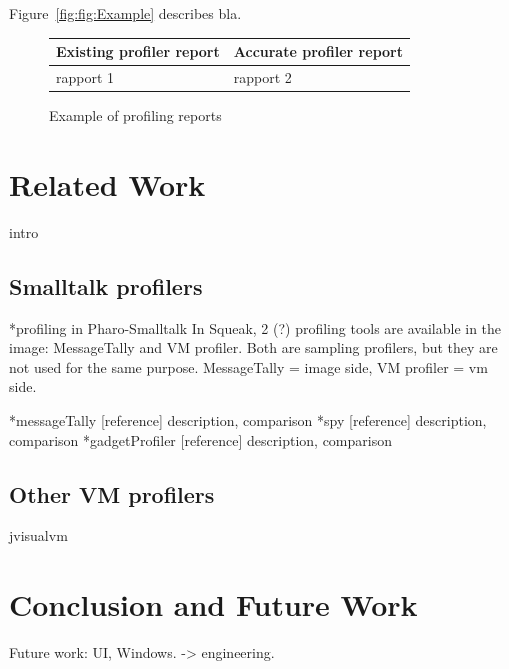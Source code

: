 \documentclass[10pt,preprint]{sigplanconf}
\newcommand{\seclabel}[1]{\label{sec:#1}}
\newcommand{\figref}[1]{Figure~\ref{fig:#1}}
\newcommand{\myparagraph}[1]{\vspace{0.1cm}\noindent \textbf{\textit{#1.}}}
\begin{document}
\figref{fig:Example} describes bla.

\begin{figure}
    \begin{center}
		\noindent \begin{tabular}{l | l}
		Existing profiler report & Accurate profiler report \\		
		\midrule
		rapport 1 & rapport 2 \\	
		\end{tabular}
	\caption{Example of profiling reports}
    \label{fig:Example}
    \end{center}
\end{figure}


\section{Related Work}\seclabel{relatedWork}

intro 

\subsection{Smalltalk profilers}

*profiling in Pharo-Smalltalk
In Squeak, 2 (?) profiling tools are available in the image: MessageTally and VM profiler. Both are sampling profilers, but they are not used for the same purpose. MessageTally = image side, VM profiler = vm side.

*messageTally [reference]
description, comparison
*spy [reference]
description, comparison
*gadgetProfiler [reference]
description, comparison

\subsection{Other VM profilers}

jvisualvm

\section{Conclusion and Future Work}\seclabel{conclusion}

Future work: UI, Windows. -> engineering.





%


\end{document}
